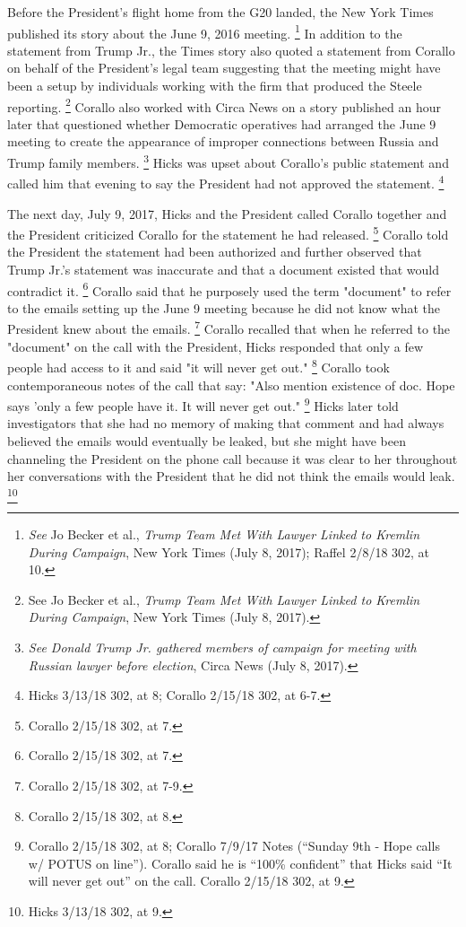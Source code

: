 Before the President's flight home from the G20 landed, the New York Times published its story about the June 9, 2016 meeting.%
\footnote{\textit{See} Jo Becker et al., \textit{Trump Team Met With Lawyer Linked to Kremlin During Campaign}, New York Times (July 8, 2017);
Raffel 2/8/18 302, at 10.}
In addition to the statement from Trump Jr., the Times story also quoted a statement from Corallo on behalf of the President's legal team suggesting that the meeting might have been a setup by individuals working with the firm that produced the Steele reporting.%
\footnote{See Jo Becker et al., \textit{Trump Team Met With Lawyer Linked to Kremlin During Campaign}, New York Times (July 8, 2017).}
Corallo also worked with Circa News on a story published an hour later that questioned whether Democratic operatives had arranged the June 9 meeting to create the appearance of improper connections between Russia and Trump family members.%
\footnote{\textit{See Donald Trump Jr. gathered members of campaign for meeting with Russian lawyer before election}, Circa News (July 8, 2017).}
Hicks was upset about Corallo's public statement and called him that evening to say the President had not approved the statement.%
\footnote{Hicks 3/13/18 302, at 8;
Corallo 2/15/18 302, at 6-7.}

The next day, July 9, 2017, Hicks and the President called Corallo together and the President criticized Corallo for the statement he had released.%
\footnote{Corallo 2/15/18 302, at 7.}
Corallo told the President the statement had been authorized and further observed that Trump Jr.'s statement was inaccurate and that a document existed that would contradict it.%
\footnote{Corallo 2/15/18 302, at 7.}
Corallo said that he purposely used the term "document" to refer to the emails setting up the June 9 meeting because he did not know what the President knew about the emails.%
\footnote{Corallo 2/15/18 302, at 7-9.}
Corallo recalled that when he referred to the "document" on the call with the President, Hicks responded that only a few people had access to it and said "it will never get out."%
\footnote{Corallo 2/15/18 302, at 8.}
Corallo took contemporaneous notes of the call that say:
"Also mention existence of doc.
Hope says 'only a few people have it.
It will never get out."%
\footnote{Corallo 2/15/18 302, at 8;
Corallo 7/9/17 Notes (“Sunday 9th - Hope calls w/ POTUS on line”).
Corallo said he is “100\% confident” that Hicks said “It will never get out” on the call.
Corallo 2/15/18 302, at 9.}
Hicks later told investigators that she had no memory of making that comment and had always believed the emails would eventually be leaked, but she might have been channeling the President on the phone call because it was clear to her throughout her conversations with the President that he did not think the emails would leak.%
\footnote{Hicks 3/13/18 302, at 9.}

